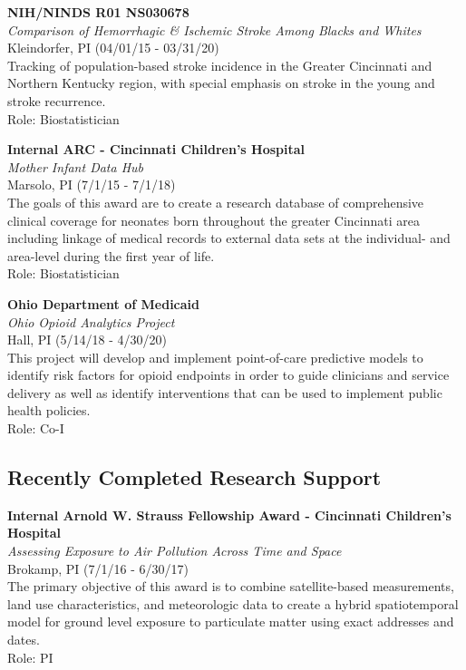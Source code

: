 \documentclass{nihbiosketch}
\begin{document}
\bigskip

\textbf{NIH/NINDS R01 NS030678}\\
\emph{Comparison of Hemorrhagic \& Ischemic Stroke Among Blacks and
	Whites}\\
Kleindorfer, PI (04/01/15 - 03/31/20)\\
Tracking of population-based stroke incidence in the Greater Cincinnati
and Northern Kentucky region, with special emphasis on stroke in the
young and stroke recurrence.\\
Role: Biostatistician

\bigskip

\textbf{Internal ARC - Cincinnati Children's Hospital}\\
\emph{Mother Infant Data Hub}\\
Marsolo, PI (7/1/15 - 7/1/18)\\
The goals of this award are to create a research database of
comprehensive clinical coverage for neonates born throughout the greater
Cincinnati area including linkage of medical records to external data
sets at the individual- and area-level during the first year of life.\\
Role: Biostatistician

\bigskip

\textbf{Ohio Department of Medicaid}\\
\emph{Ohio Opioid Analytics Project}\\
Hall, PI (5/14/18 - 4/30/20)\\
This project will develop and implement point-of-care predictive models
to identify risk factors for opioid endpoints in order to guide
clinicians and service delivery as well as identify interventions that
can be used to implement public health policies.\\
Role: Co-I

\bigskip


\subsection*{Recently Completed Research Support}

\bigskip

\textbf{Internal Arnold W. Strauss Fellowship Award - Cincinnati
	Children's Hospital}\\
\emph{Assessing Exposure to Air Pollution Across Time and Space}\\
Brokamp, PI (7/1/16 - 6/30/17)\\
The primary objective of this award is to combine satellite-based
measurements, land use characteristics, and meteorologic data to create
a hybrid spatiotemporal model for ground level exposure to particulate
matter using exact addresses and dates.\\
Role: PI
\end{document}
